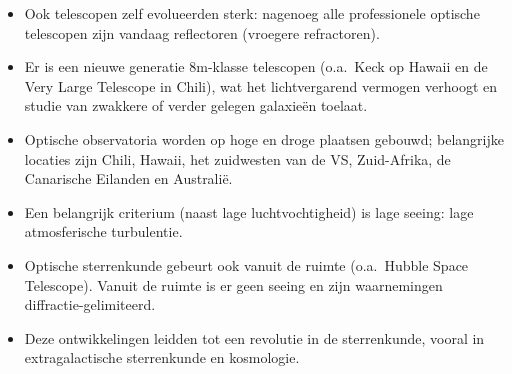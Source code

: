 \documentclass[10pt,a4paper]{article}
\begin{document}
\begin{itemize}
  \item Ook telescopen zelf evolueerden sterk: nagenoeg alle professionele optische telescopen zijn vandaag reflectoren (vroegere refractoren).
  \item Er is een nieuwe generatie 8m-klasse telescopen (o.a.\ Keck op Hawaii en de Very Large Telescope in Chili), wat het lichtvergarend vermogen verhoogt en studie van zwakkere of verder gelegen galaxie\"en toelaat.
  \item Optische observatoria worden op hoge en droge plaatsen gebouwd; belangrijke locaties zijn Chili, Hawaii, het zuidwesten van de VS, Zuid-Afrika, de Canarische Eilanden en Australi\"e.
  \item Een belangrijk criterium (naast lage luchtvochtigheid) is lage seeing: lage atmosferische turbulentie.
  \item Optische sterrenkunde gebeurt ook vanuit de ruimte (o.a.\ Hubble Space Telescope). Vanuit de ruimte is er geen seeing en zijn waarnemingen diffractie-gelimiteerd.
  \item Deze ontwikkelingen leidden tot een revolutie in de sterrenkunde, vooral in extragalactische sterrenkunde en kosmologie.
\end{itemize}
\end{document}
